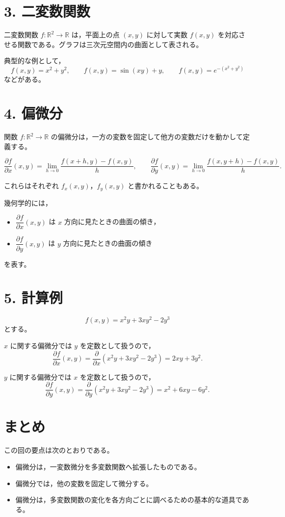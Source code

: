 \documentclass[a4paper,11pt]{jsarticle}
\begin{document}
\section*{3. 二変数関数}

二変数関数 $f:\mathbb{R}^2\to\mathbb{R}$ は，平面上の点 $(x,y)$ に対して実数 $f(x,y)$ を対応させる関数である。グラフは三次元空間内の曲面として表される。

典型的な例として，
\[
f(x,y)=x^2+y^2, \qquad
f(x,y)=\sin(xy)+y, \qquad
f(x,y)=e^{-(x^2+y^2)}
\]
などがある。

\section*{4. 偏微分}

関数 $f:\mathbb{R}^2\to\mathbb{R}$ の偏微分は，一方の変数を固定して他方の変数だけを動かして定義する。

\[
\frac{\partial f}{\partial x}(x,y)
= \lim_{h\to 0}\frac{f(x+h,y)-f(x,y)}{h},
\qquad
\frac{\partial f}{\partial y}(x,y)
= \lim_{h\to 0}\frac{f(x,y+h)-f(x,y)}{h}.
\]

これらはそれぞれ $f_x(x,y)$，$f_y(x,y)$ と書かれることもある。

幾何学的には，
\begin{itemize}[leftmargin=2em]
\item $\dfrac{\partial f}{\partial x}(x,y)$ は $x$ 方向に見たときの曲面の傾き，
\item $\dfrac{\partial f}{\partial y}(x,y)$ は $y$ 方向に見たときの曲面の傾き
\end{itemize}
を表す。

\section*{5. 計算例}

\[
f(x,y)=x^2y+3xy^2-2y^3
\]
とする。

$x$ に関する偏微分では $y$ を定数として扱うので，
\[
\frac{\partial f}{\partial x}(x,y)
= \frac{\partial}{\partial x}(x^2y+3xy^2-2y^3)
= 2xy+3y^2.
\]

$y$ に関する偏微分では $x$ を定数として扱うので，
\[
\frac{\partial f}{\partial y}(x,y)
= \frac{\partial}{\partial y}(x^2y+3xy^2-2y^3)
= x^2+6xy-6y^2.
\]

\section*{まとめ}

この回の要点は次のとおりである。
\begin{itemize}[leftmargin=2em]
\item 偏微分は，一変数微分を多変数関数へ拡張したものである。
\item 偏微分では，他の変数を固定して微分する。
\item 偏微分は，多変数関数の変化を各方向ごとに調べるための基本的な道具である。
\end{itemize}
\end{document}
